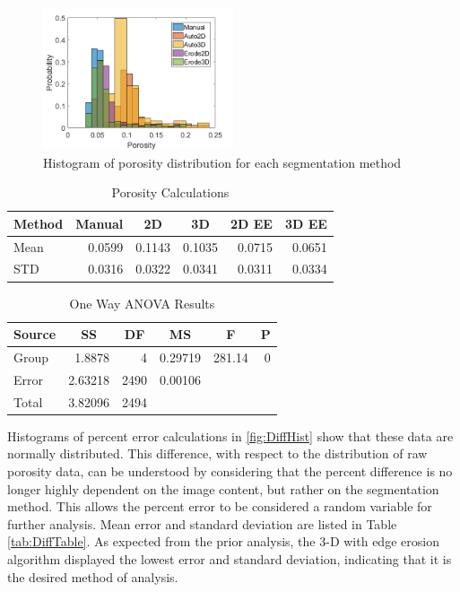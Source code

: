 \documentclass[11pt, twocolumn]{article}
\begin{document}
\begin{figure}[H]
	\centering
	\includegraphics[width=0.5\textwidth]{DataHistograms.png}
	\caption{Histogram of porosity distribution for each segmentation method}
	\label{fig:DataHist}
\end{figure}
\begin{table}[htbp]
	\centering
	\caption{Porosity Calculations}
	\begin{tabular}{|l|r|r|r|r|r|}
		\toprule
		Method & \multicolumn{1}{c|}{Manual} & \multicolumn{1}{c|}{2D} & \multicolumn{1}{c|}{3D} & \multicolumn{1}{c|}{2D EE} & \multicolumn{1}{c|}{3D EE} \\
		\midrule
		Mean  & 0.0599 & 0.1143 & 0.1035 & 0.0715 & 0.0651 \\
		\midrule
		STD   & 0.0316 & 0.0322 & 0.0341 & 0.0311 & 0.0334 \\
		\bottomrule
	\end{tabular}%
	\label{tab:DataTable}%
\end{table}%
\begin{table}[htbp]
	\centering
	\caption{One Way ANOVA Results}
	\begin{tabular}{|lrrrrr|}
		\toprule
		\multicolumn{1}{|c}{Source} & \multicolumn{1}{c}{SS} & \multicolumn{1}{c}{DF} & \multicolumn{1}{c}{MS} & \multicolumn{1}{c}{F} & \multicolumn{1}{c|}{P } \\
		\midrule
		Group & 1.8878 & 4     & 0.29719 & 281.14 & 0 \\
		Error & 2.63218 & 2490  & 0.00106 &       &  \\
		Total & 3.82096 & 2494  &       &       &  \\
		\bottomrule
	\end{tabular}%
	\label{tab:OneWay}%
\end{table}%

Histograms of percent error calculations in \ref{fig:DiffHist} show that these data are normally distributed. This difference, with respect to the distribution of raw porosity data, can be understood by considering that the percent difference is no longer highly dependent on the image content, but rather on the segmentation method. This allows the percent error to be considered a random variable for further analysis. Mean error and standard deviation are listed in Table \ref{tab:DiffTable}. As expected from the prior analysis, the 3-D with edge erosion algorithm displayed the lowest error and standard deviation, indicating that it is the desired method of analysis. 
\end{document}
